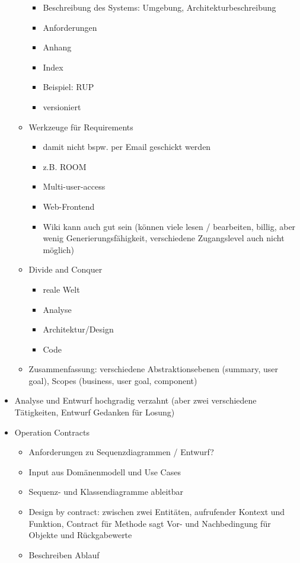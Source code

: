 \documentclass[paper=a4, fontsize=11pt]{scrartcl} %
\numberwithin{equation}{section} %
\numberwithin{figure}{section} %
\numberwithin{table}{section} %
\begin{document}
\begin{itemize}
\begin{itemize}
\begin{itemize}
      \item Beschreibung des Systems: Umgebung, Architekturbeschreibung
      \item Anforderungen
      \item Anhang
      \item Index
      \item Beispiel: RUP
      \item versioniert
    \end{itemize}
    \item Werkzeuge für Requirements
    \begin{itemize}
      \item damit nicht bspw. per Email geschickt werden
      \item z.B. ROOM
      \item Multi-user-access
      \item Web-Frontend
      \item Wiki kann auch gut sein (können viele lesen / bearbeiten, billig, aber wenig Generierungsfähigkeit, verschiedene Zugangslevel auch nicht möglich)
    \end{itemize}
    \item Divide and Conquer
    \begin{itemize}
      \item reale Welt
      \item Analyse
      \item Architektur/Design
      \item Code
    \end{itemize}
    \item Zusammenfassung: verschiedene Abstraktionsebenen (summary, user goal), Scopes (business, user goal, component)
  \end{itemize}
  \item Analyse und Entwurf hochgradig verzahnt (aber zwei verschiedene Tätigkeiten, Entwurf Gedanken für Losung)
  \item Operation Contracts
  \begin{itemize}
    \item Anforderungen zu Sequenzdiagrammen / Entwurf?
    \item Input aus Domänenmodell und Use Cases
    \item Sequenz- und Klassendiagramme ableitbar
    \item Design by contract: zwischen zwei Entitäten, aufrufender Kontext und Funktion, Contract für Methode sagt Vor- und Nachbedingung für Objekte und Rückgabewerte
    \item Beschreiben Ablauf

\end{itemize}
\end{itemize}
\end{document}
